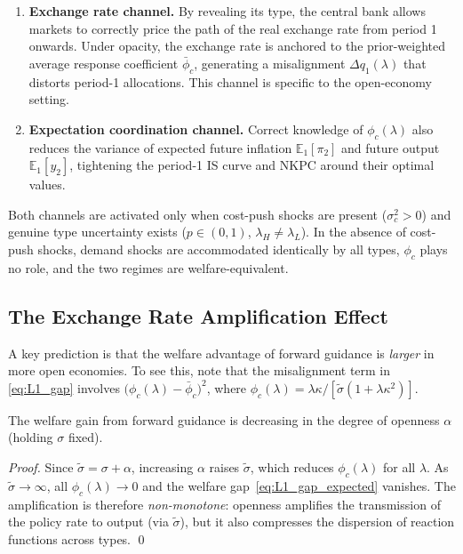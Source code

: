 \begin{enumerate}[label=(\roman*)]
  \item \textbf{Exchange rate channel.} By revealing its type, the central bank allows
        markets to correctly price the path of the real exchange rate from period 1
        onwards. Under opacity, the exchange rate is anchored to the prior-weighted
        average response coefficient $\bar{\phi}_c$, generating a misalignment
        $\Delta q_1(\lambda)$ that distorts period-1 allocations. This channel is
        specific to the open-economy setting.

  \item \textbf{Expectation coordination channel.} Correct knowledge of $\phi_c(\lambda)$
        also reduces the variance of expected future inflation $\mathbb{E}_1[\pi_2]$
        and future output $\mathbb{E}_1[y_2]$, tightening the period-1 IS curve and
        NKPC around their optimal values.
\end{enumerate}

Both channels are activated only when cost-push shocks are present ($\sigma_c^2 > 0$)
and genuine type uncertainty exists ($p \in (0,1)$, $\lambda_H \neq \lambda_L$). In
the absence of cost-push shocks, demand shocks are accommodated identically by all
types, $\phi_c$ plays no role, and the two regimes are welfare-equivalent.

\subsection{The Exchange Rate Amplification Effect}
\label{sec:amplification}

A key prediction is that the welfare advantage of forward guidance is \emph{larger}
in more open economies. To see this, note that the misalignment term in
\eqref{eq:L1_gap} involves $\bigl(\phi_c(\lambda) - \bar{\phi}_c\bigr)^2$, where
$\phi_c(\lambda) = \lambda\kappa/[\tilde{\sigma}(1+\lambda\kappa^2)]$.

\begin{corollary}
\label{cor:openness}
The welfare gain from forward guidance is decreasing in the degree of openness
$\alpha$ (holding $\sigma$ fixed).
\end{corollary}

\begin{proof}
Since $\tilde{\sigma} = \sigma + \alpha$, increasing $\alpha$ raises $\tilde{\sigma}$,
which reduces $\phi_c(\lambda)$ for all $\lambda$. As $\tilde{\sigma} \to \infty$, all
$\phi_c(\lambda) \to 0$ and the welfare gap~\eqref{eq:L1_gap_expected} vanishes.
The amplification is therefore \emph{non-monotone}: openness amplifies the
transmission of the policy rate to output (via $\tilde{\sigma}$), but it also
compresses the dispersion of reaction functions across types. \qed
\end{proof}

